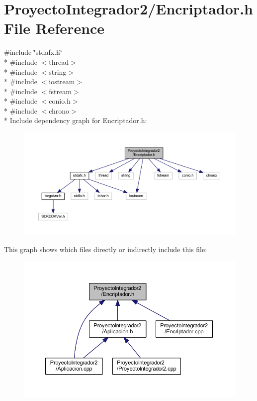 \section{Proyecto\-Integrador2/\-Encriptador.h File Reference}
\label{_encriptador_8h}
{\ttfamily \#include \char`\"{}stdafx.\-h\char`\"{}}\\*
{\ttfamily \#include $<$thread$>$}\\*
{\ttfamily \#include $<$string$>$}\\*
{\ttfamily \#include $<$iostream$>$}\\*
{\ttfamily \#include $<$fstream$>$}\\*
{\ttfamily \#include $<$conio.\-h$>$}\\*
{\ttfamily \#include $<$chrono$>$}\\*
Include dependency graph for Encriptador.\-h\-:\nopagebreak
\begin{figure}[H]
\begin{center}
\leavevmode
\includegraphics[width=350pt]{_encriptador_8h__incl}
\end{center}
\end{figure}
This graph shows which files directly or indirectly include this file\-:\nopagebreak
\begin{figure}[H]
\begin{center}
\leavevmode
\includegraphics[width=350pt]{_encriptador_8h__dep__incl}
\end{center}
\end{figure}
